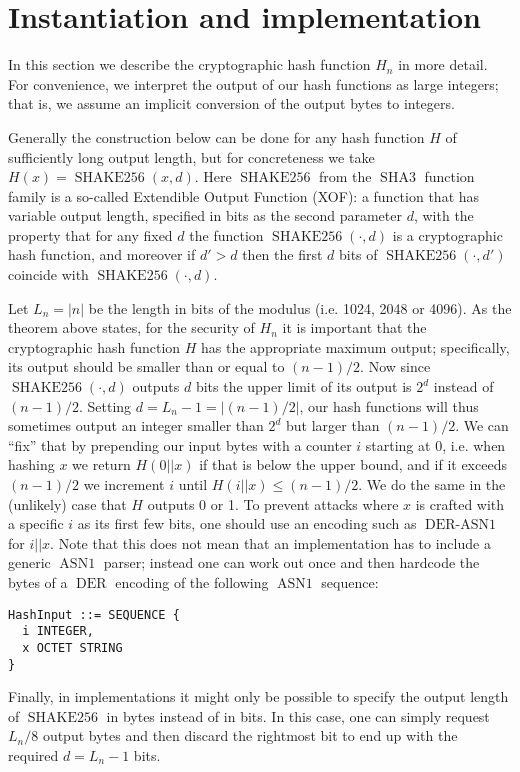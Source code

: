 \documentclass[a4paper,12pt]{article}
\DeclareMathOperator{\shake}{SHAKE256}
\DeclareMathOperator{\asn}{ASN1}
\DeclareMathOperator{\der}{DER}
\DeclareMathOperator{\derasn}{DER-ASN1}
\DeclareMathOperator{\sha}{SHA3}
\begin{document}
\section{Instantiation and implementation}
In this section we describe the cryptographic hash function $H_n$ in more detail. For convenience, we interpret the output of our hash functions as large integers; that is, we assume an implicit conversion of the output bytes to integers.

Generally the construction below can be done for any hash function $H$ of sufficiently long output length, but for concreteness we take $H(x) = \shake(x, d)$. Here $\shake$ from the $\sha$ function family is a so-called Extendible Output Function (XOF): a function that has variable output length, specified in bits as the second parameter $d$, with the property that for any fixed $d$ the function $\shake(\cdot, d)$ is a cryptographic hash function, and moreover if $d' > d$ then the first $d$ bits of $\shake(\cdot, d')$ coincide with $\shake(\cdot, d)$.

Let $L_n = |n|$ be the length in bits of the modulus (i.e. 1024, 2048 or 4096). As the theorem above states, for the security of $H_n$ it is important that the cryptographic hash function $H$ has the appropriate maximum output; specifically, its output should be smaller than or equal to $(n-1)/2$. Now since $\shake(\cdot, d)$ outputs $d$ bits the upper limit of its output is $2^d$ instead of $(n-1)/2$. Setting $d = L_n-1 = |(n-1)/2|$, our hash functions will thus sometimes output an integer smaller than $2^d$ but larger than $(n-1)/2$. We can ``fix'' that by prepending our input bytes with a counter $i$ starting at 0, i.e. when hashing $x$ we return $H(0 || x)$ if that is below the upper bound, and if it exceeds $(n-1)/2$ we increment $i$ until $H(i || x) \leq (n-1)/2$. We do the same in the (unlikely) case that $H$ outputs 0 or 1. To prevent attacks where $x$ is crafted with a specific $i$ as its first few bits, one should use an encoding such as $\derasn$ for $i || x$.
Note that this does not mean that an implementation has to include a generic $\asn$ parser; instead one can work out once and then hardcode the bytes of a $\der$ encoding of the following $\asn$ sequence:

\begin{verbatim}
HashInput ::= SEQUENCE {
  i INTEGER,
  x OCTET STRING
}
\end{verbatim}

\noindent Finally, in implementations it might only be possible to specify the output length of $\shake$ in bytes instead of in bits. In this case, one can simply request $L_n/8$ output bytes and then discard the rightmost bit to end up with the required $d = L_n-1$ bits.
\end{document}

